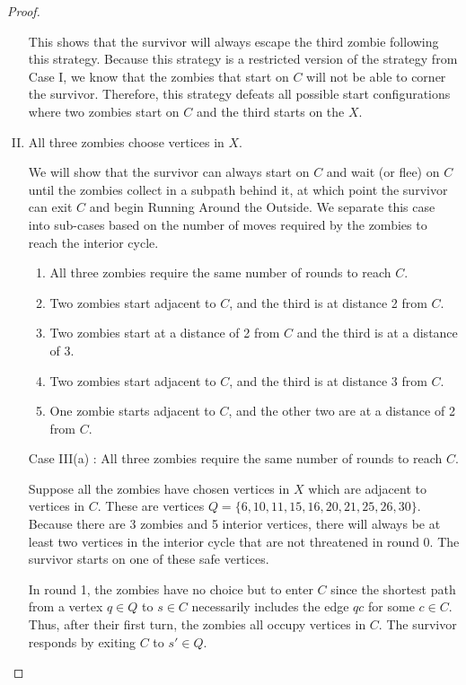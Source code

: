 \begin{proof}
\begin{enumerate}[I.]
This shows that the survivor will always escape the third zombie following this strategy. Because this strategy is a restricted version of the strategy from
Case I, we know that the zombies that start on $C$ will not be able to corner the survivor. Therefore, this strategy defeats all possible
start configurations where two zombies start on $C$ and the third starts on the $X$.

\item All three zombies choose vertices in $X$.\label{planar case 3}

We will show that the survivor can always start on $C$ and wait (or flee) on $C$ until the zombies collect in a subpath behind it, at which point the survivor can exit $C$ and begin Running Around the Outside. We separate this case into sub-cases based on the number of moves required by the zombies to reach the interior cycle.

\begin{enumerate}
  \item All three zombies require the same number of rounds to reach $C$.
  \item Two zombies start adjacent to $C$, and the third is at distance 2 from $C$.
  \item Two zombies start at a distance of 2 from $C$ and the third is at a distance of 3.
  \item Two zombies start adjacent to $C$, and the third is at distance 3 from $C$.
  \item One zombie starts adjacent to $C$, and the other two are at a distance of 2 from $C$.
\end{enumerate}


\item[Case III(a)]: All three zombies require the same number of rounds to reach $C$.

Suppose all the zombies have chosen vertices in $X$ which are adjacent to vertices in $C$. These are vertices $Q = \{6, 10, 11, 15, 16, 20, 21, 25, 26, 30 \}$.
Because there are 3 zombies and 5 interior vertices, there will always be at least two vertices in the interior cycle that are not threatened in
round 0. The survivor starts on one of these safe vertices.

In round 1, the zombies have no choice but to enter $C$ since the shortest path from a vertex $q \in Q$ to
$s \in C$ necessarily includes the edge $qc$ for some $c \in C$. Thus, after their first turn, the zombies all occupy vertices in $C$.
The survivor responds by exiting $C$ to $s' \in Q$.


\end{enumerate}
\end{proof}
